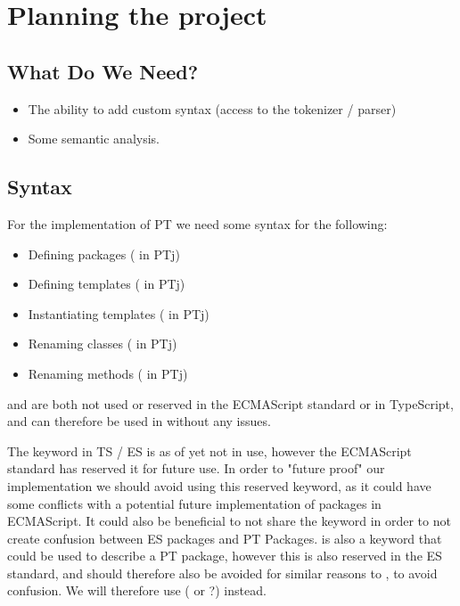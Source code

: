 
\chapter{Planning the project}\label{ch:planning-the-project}

\section{What Do We Need?}\label{sec:what-do-we-need}

\begin{itemize}
    \item The ability to add custom syntax (access to the tokenizer / parser)
    \item Some semantic analysis.
\end{itemize}

\section{Syntax}\label{sec:syntax}

For the implementation of PT we need some syntax for the following:

\begin{itemize}
    \item Defining packages ( in PTj)
    \item Defining templates ( in PTj)
    \item Instantiating templates ( in PTj)
    \item Renaming classes (\codeword{=>} in PTj)
    \item Renaming methods (\codeword{->} in PTj)
\end{itemize}

 and  are both not used or reserved in the ECMAScript standard or in TypeScript, and can therefore be used in \languagename without any issues.

The keyword  in TS / ES is as of yet not in use, however the ECMAScript standard has reserved it for future use.
In order to "future proof" our implementation we should avoid using this reserved keyword, as it could have some conflicts with a potential future implementation of packages in ECMAScript.
It could also be beneficial to not share the keyword in order to not create confusion between ES packages and PT Packages.
 is also a keyword that could be used to describe a PT package, however this is also reserved in the ES standard, and should therefore also be avoided for similar reasons to , to avoid confusion. We will therefore use ( or ?) instead. %

